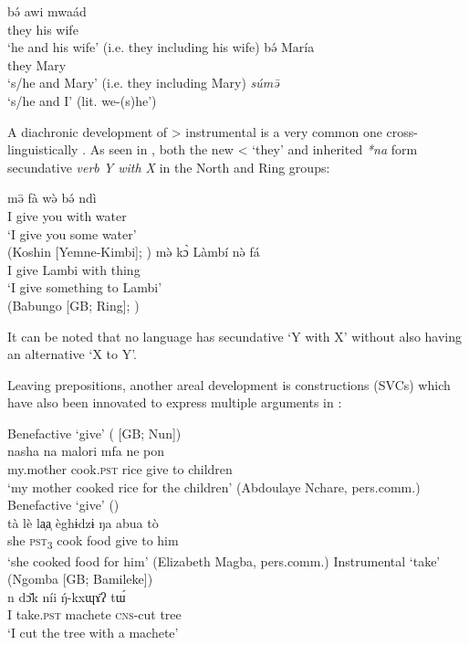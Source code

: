 \documentclass[output=paper]{langsci/langscibook}
\begin{document}
\ea
\label{ex:hyman:24}
\ea 
\gll b\'ə   awi  mwaád\\
they his   wife \\ 
\glt ‘he and his wife’  (i.e. they including his wife)
\ex 
\gll b\'ə  María\\
they Mary\\
\glt ‘s/he and Mary’  (i.e. they including Mary)
\ex 
\textit{súm\=ə}\\
\glt ‘s/he and I’   (lit. we-(s)he’)
\z 
\z 

A diachronic development of  {\textgreater} instrumental is a very common one cross-linguistically \citep[292]{CreisselsVoisin-Nougier2008}. As seen in , both the new  {\textless} ‘they’ and inherited \textit{*na} form secundative \textit{verb Y with X} in the North and Ring groups:\largerpage

\ea
\label{ex:hyman:25}
\ea 
\gll m\=ə   fà  w\`ə   b\'ə    ndì \\ 
I    give you  with water\\
\glt ‘I give you some water’\\
(Koshin [Yemne-Kimbi]; \citealt[309]{Ousmanou2014})
\ex 
\gll m\`ə  k\`ɔ  Làmbí  n\`ə   fá\\  
I  give Lambi with thing\\
\glt ‘I give something to Lambi’\\
(Babungo [GB; Ring]; \citealt[60]{Schaub1985})
\z 
\z 

\noindent
It can be noted that no  language has secundative ‘Y with X’ without also having an alternative ‘X to Y’.

Leaving prepositions, another areal development is  constructions (SVCs) which have also been innovated to express multiple arguments in :
  
\ea
\label{ex:hyman:26}
\ea 
Benefactive ‘give’ ( [GB; Nun]) \\
\gll nasha           na     malori  mfa  ne  pon  \\
my.mother cook.\textsc{pst}  rice     give   to children\\
\glt ‘my mother cooked rice for the children’ (Abdoulaye Nchare, pers.comm.)
\ex 
Benefactive ‘give’ ()\\
\gll tà   lè    la̹a̹  èghɨdzɨ  ŋa  abua  tò \\ 
she \textsc{pst}\textsubscript{3} cook   food  give  to  him\\
\glt ‘she cooked food for him’ (Elizabeth Magba, pers.comm.)  
\ex 
Instrumental ‘take’ (Ngomba [GB; Bamileke]) \\
\gll n   d\v{ɔ}k       níi      \'{ŋ}-kxɰ\=ɤʔ  t\'ɯ \\
I take.\textsc{pst} machete  \textsc{cns}-cut tree\\
\glt ‘I cut the tree with a machete’ \citep[60]{Satre2010}  
\z 
\z 
\end{document}
